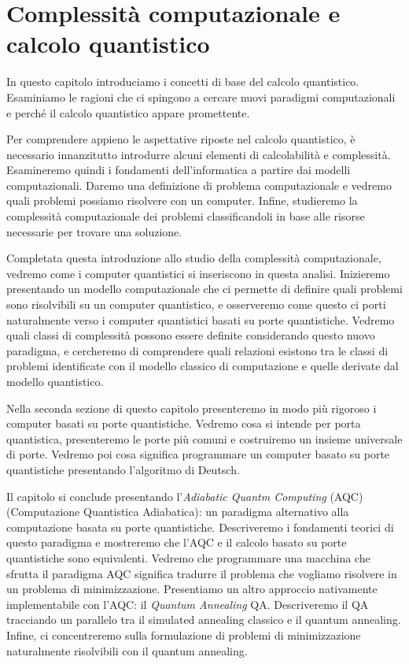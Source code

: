 \chapter{Complessità computazionale e calcolo quantistico}
\label{ch:qc}
In questo capitolo introduciamo i concetti di base del calcolo quantistico. Esaminiamo le ragioni che ci spingono a cercare nuovi paradigmi computazionali e perché il calcolo quantistico appare promettente.

Per comprendere appieno le aspettative riposte nel calcolo quantistico, è necessario innanzitutto introdurre alcuni elementi di calcolabilità e complessità. Esamineremo quindi i fondamenti dell'informatica a partire dai modelli computazionali. Daremo una definizione di problema computazionale e vedremo quali problemi possiamo risolvere con un computer. Infine, studieremo la complessità computazionale dei problemi classificandoli in base alle risorse necessarie per trovare una soluzione.

Completata questa introduzione allo studio della complessità computazionale, vedremo come i computer quantistici si inseriscono in questa analisi. Inizieremo presentando un modello computazionale che ci permette di definire quali problemi sono risolvibili su un computer quantistico, e osserveremo come questo ci porti naturalmente verso i computer quantistici basati su porte quantistiche. Vedremo quali classi di complessità possono essere definite considerando questo nuovo paradigma, e cercheremo di comprendere quali relazioni esistono tra le classi di problemi identificate con il modello classico di computazione e quelle derivate dal modello quantistico.

Nella seconda sezione di questo capitolo presenteremo in modo più rigoroso i computer basati su porte quantistiche. Vedremo cosa si intende per porta quantistica, presenteremo le porte più comuni e costruiremo un insieme universale di porte. Vedremo poi cosa significa programmare un computer basato su porte quantistiche presentando l'algoritmo di Deutsch.

Il capitolo si conclude presentando l'\emph{Adiabatic Quantm Computing} (AQC) (Computazione Quantistica Adiabatica): un paradigma alternativo alla computazione basata su porte quantistiche. Descriveremo i fondamenti teorici di questo paradigma e mostreremo che l'AQC e il calcolo basato su porte quantistiche sono equivalenti. Vedremo che programmare una macchina che sfrutta il paradigma AQC significa tradurre il problema che vogliamo risolvere in un problema di minimizzazione.
Presentiamo un altro approccio nativamente implementabile con l'AQC: il \emph{Quantum Annealing} QA. Descriveremo il QA tracciando un parallelo tra il simulated annealing classico e il quantum annealing. Infine, ci concentreremo sulla formulazione di problemi di minimizzazione naturalmente risolvibili con il quantum annealing.

